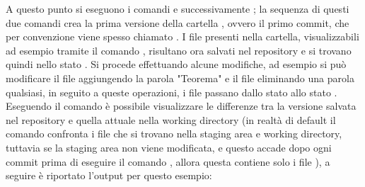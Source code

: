 A questo punto si eseguono i comandi  e successivamente ; la sequenza di questi due comandi crea la prima versione della cartella , ovvero il primo commit, che per convenzione viene spesso chiamato . 
I file presenti nella cartella, visualizzabili ad esempio tramite il comando , risultano ora salvati nel repository e si trovano quindi nello stato .
Si procede effettuando alcune modifiche, ad esempio si può modificare il file  aggiungendo la parola "Teorema" e il file  eliminando una parola qualsiasi, in seguito a queste operazioni, i file passano dallo stato  allo stato . Eseguendo il comando  è possibile visualizzare le differenze tra la versione salvata nel repository e quella attuale nella working directory (in realtà di default il comando  confronta i file che si trovano nella staging area e working directory, tuttavia se la staging area non viene modificata, e questo accade dopo ogni commit prima di eseguire il comando , allora questa contiene solo i file ), a seguire è riportato l'output per questo esempio:

